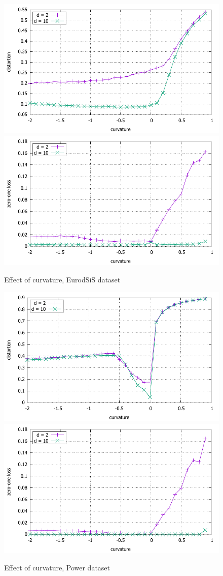\documentclass{article} %
\begin{document}
\begin{figure}
    \centering
    \includegraphics[width = 0.49 \textwidth]{EuroSiS_distortion.pdf}
    \includegraphics[width = 0.49 \textwidth]{EuroSiS_zero_one.pdf}
    \caption{Effect of curvature, EurodSiS dataset}
    \label{fig:EurodSiS}
\end{figure}

\begin{figure}
    \centering
    \includegraphics[width = 0.49 \textwidth]{power_distortion.pdf}
    \includegraphics[width = 0.49 \textwidth]{power_zero_one.pdf}
    \caption{Effect of curvature, Power dataset}
    \label{fig:power}
\end{figure}
\end{document}

